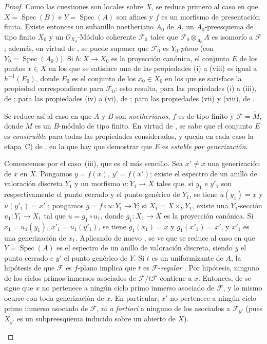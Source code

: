 \begin{proof}
Como las cuestiones son locales sobre $X$, se reduce primero al caso en que $X=\operatorname{Spec}(B)$ e $Y=\operatorname{Spec}(A)$ son afines y $f$ es un morfismo de presentación finita.
Existe entonces un subanillo noetheriano $A_0$ de $A$, un $A_0$-preesquema de tipo finito $X_0$ y un $\mathcal O_{X_0}$-Módulo coherente $\mathcal F_0$ tales que $\mathcal F_0\otimes_{A_0}A$ es isomorfo a $\mathcal F$ ; además, en virtud de , se puede suponer que $\mathcal F_0$ es $Y_0$-\emph{plano} (con $Y_0=\operatorname{Spec}(A_0)$).
Si $h:X\to X_0$ es la proyección canónica, el conjunto $E$ de los puntos $x\in X$ en los que se satisface una de las propiedades (i) a (viii) es igual a $h^{-1}(E_0)$, donde $E_0$ es el conjunto de los $x_0\in X_0$ en los que se satisface la propiedad correspondiente para $\mathcal F_0$: esto resulta, para las propiedades (i) a (iii), de ; para las propiedades (iv) a (vi), de ; para las propiedades (vii) y (viii), de .


Se reduce así al caso en que $A$ y $B$ son \emph{noetherianos}, $f$ es de tipo finito y $\mathcal F=\widetilde M$, donde $M$ es un $B$-módulo de tipo finito.
En virtud de , se sabe que el conjunto $E$ es \emph{construible} para todas las propiedades consideradas, y queda en cada caso la etapa~C) de , en la que hay que demostrar que $E$ es \emph{estable por generización}.

\begin{env}[12.1.1.1]
\label{IV.12.1.1.1}
Comencemos por el caso~(iii), que es el más sencillo.
Sea $x'\ne x$ una generización de $x$ en $X$.
Pongamos $y=f(x)$, $y'=f(x')$; existe el espectro de un anillo de valoración discreta $Y_1$ y un morfismo $u:Y_1\to X$ tales que, si $y_1$ e $y'_1$ son respectivamente el punto cerrado y el punto genérico de $Y_1$, se tiene $u(y_1)=x$ y $u(y'_1)=x'$ ; pongamos $g=f\circ u:Y_1\to Y$; si $X_1=X\times_YY_1$, existe una $Y_1$-sección $u_1:Y_1\to X_1$ tal que $u=g_1\circ u_1$, donde $g_1:X_1\to X$ es la proyección canónica.
Si $x_1=u_1(y_1)$, $x'_1=u_1(y'_1)$, se tiene $g_1(x_1)=x$ y $g_1(x'_1)=x'$, y $x'_1$ es una generización de $x_1$.
Aplicando de nuevo , se ve
que se reduce al caso en que $Y=\operatorname{Spec}(A)$ es el espectro de un anillo de valoración discreta, siendo $y$ el punto cerrado e $y'$ el punto genérico de $Y$.
Si $t$ es un uniformizante de $A$, la hipótesis de que $\mathcal F$ es $f$-plano implica que $t$ es $\mathcal F$-\emph{regular} .
Por hipótesis, ninguno de los ciclos primos inmersos asociados de $\mathcal F/t\mathcal F$ contiene a $x$.
Entonces, de  se sigue que $x$ no pertenece a ningún ciclo primo inmerso asociado de $\mathcal F$, y lo mismo ocurre con toda generización de $x$.
En particular, $x'$ no pertenece a ningún ciclo primo inmerso asociado de $\mathcal F$, ni \emph{a fortiori} a ninguno de los asociados a $\mathcal F_{y'}$ (pues $X_{y'}$ es un subpreesquema inducido sobre un abierto de $X$).
\end{env}


\end{proof}
